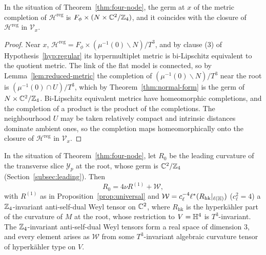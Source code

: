 \begin{lemma}\label{lem:completion}
In the situation of Theorem~\ref{thm:four-node}, the germ at $x$ of the metric completion of
$\mathcal H^{\mathrm{reg}}$ is $F_\phi\times(N\times\mathbb C^2/\mathbb Z_4)$, and it coincides with the
closure of $\mathcal H^{\mathrm{reg}}$ in $\mathcal V_x$.
\end{lemma}

\begin{proof}
Near $x$, $\mathcal H^{\mathrm{reg}}=F_\phi\times(\mu^{-1}(0)\smallsetminus N)/T^3$, and by
clause (3) of Hypothesis~\ref{hyp:regular} its hypermultiplet metric is bi-Lipschitz equivalent
to the quotient metric. The link of the flat model is connected, so by
Lemma~\ref{lem:reduced-metric} the completion of $(\mu^{-1}(0)\smallsetminus N)/T^3$ near the
root is $(\mu^{-1}(0)\cap U)/T^3$, which by Theorem~\ref{thm:normal-form} is the germ of
$N\times\mathbb C^2/\mathbb Z_4$. Bi-Lipschitz equivalent metrics have homeomorphic completions, and the
completion of a product is the product of the completions. The neighbourhood $U$ may be taken
relatively compact and intrinsic distances dominate ambient ones, so the completion maps
homeomorphically onto the closure of $\mathcal H^{\mathrm{reg}}$ in $\mathcal V_x$.
\end{proof}

\begin{proposition}\label{prop:x9-leading}
In the situation of Theorem~\ref{thm:four-node}, let $R_0$ be the leading curvature of the transverse
slice $\mathcal Y_p$ at the root, whose germ is $\mathbb C^2/\mathbb Z_4$ (Section~\ref{subsec:leading}). Then
\begin{equation}
 R_0=4\nu R^{(1)}+\mathcal W,
 \label{eq:x9-leading}
\end{equation}
with $R^{(1)}$ as in Proposition~\ref{prop:universal} and $\mathcal W=c_\ell^{-4}\ell^*(R_{\mathrm{hk}}|_{\ell(\mathbb H)})$
($c_\ell^2=4$) a $\mathbb Z_4$-invariant anti-self-dual Weyl tensor on $\mathbb C^2$, where $R_{\mathrm{hk}}$ is the hyperk\"ahler
part of the curvature of $M$ at the root, whose restriction to $V=\mathbb H^4$ is $T^3$-invariant. The $\mathbb Z_4$-invariant anti-self-dual Weyl
tensors form a real space of dimension $3$, and every element arises as $\mathcal W$ from some
$T^3$-invariant algebraic curvature tensor of hyperk\"ahler type on $V$.
\end{proposition}

